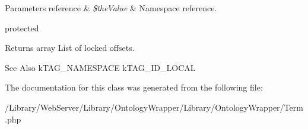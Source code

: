 \begin{DoxyParams}[1]{Parameters}
reference & {\em \$the\-Value} & Namespace reference.\\
\hline
\end{DoxyParams}
protected \begin{DoxyReturn}{Returns}
array List of locked offsets.
\end{DoxyReturn}
\begin{DoxySeeAlso}{See Also}
k\-T\-A\-G\-\_\-\-N\-A\-M\-E\-S\-P\-A\-C\-E k\-T\-A\-G\-\_\-\-I\-D\-\_\-\-L\-O\-C\-A\-L 
\end{DoxySeeAlso}


The documentation for this class was generated from the following file\-:\begin{DoxyCompactItemize}
\item 
/\-Library/\-Web\-Server/\-Library/\-Ontology\-Wrapper/\-Library/\-Ontology\-Wrapper/Term.\-php\end{DoxyCompactItemize}
